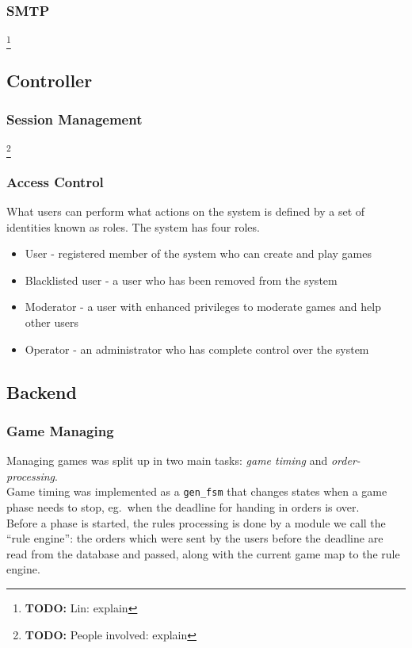 \documentclass[11pt,a4paper]{report}
\newcommand{\todo}[1]{\footnote{{\color{red} {\bf TODO:} #1}}}
\begin{document}
\subsubsection{SMTP}
\todo{Lin: explain}

\subsection{Controller}
\subsubsection{Session Management}
\todo{People involved: explain}

\subsubsection{Access Control}
What users can perform what actions on the system is defined by a set of identities known as roles. The system has four roles.

\begin{itemize}
\item User - registered member of the system who can create and play games
\item Blacklisted user - a user who has been removed from the system
\item Moderator - a user with enhanced privileges to moderate games and help other users
\item Operator - an administrator who has complete control over the system

\end{itemize}

\subsection{Backend}
\subsubsection{Game Managing}
Managing games was split up in two main tasks: {\em game timing\/} and
{\em order-processing}. \\
Game timing was implemented as a {\tt gen\_fsm} that changes states when a game
phase needs to stop, eg.\ when the deadline for handing in orders is over.\\
Before a phase is started, the rules processing is done by a module we call
the ``rule engine'': the orders which were sent by the users before the deadline
are read from the database and passed, along with the current game map to the
rule engine.
\end{document}
